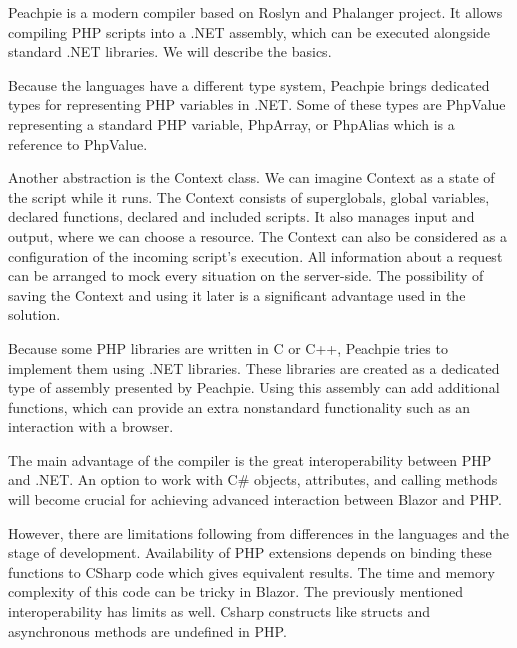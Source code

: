 Peachpie  is a modern compiler based on Roslyn and Phalanger project.
It allows compiling PHP scripts into a .NET assembly, which can be executed alongside standard .NET libraries.
We will describe the basics.
\par
Because the languages have a different type system, Peachpie brings dedicated types for representing PHP variables in .NET.
Some of these types are PhpValue representing a standard PHP variable, PhpArray, or PhpAlias which is a reference to PhpValue.
\par
Another abstraction is the Context class.
We can imagine Context as a state of the script while it runs.
The Context consists of superglobals, global variables, declared functions, declared and included scripts.
It also manages input and output, where we can choose a resource.
The Context can also be considered as a configuration of the incoming script's execution.
All information about a request can be arranged to mock every situation on the server-side.
The possibility of saving the Context and using it later is a significant advantage used in the solution.
\par
{}
Because some PHP libraries are written in C or C++, Peachpie tries to implement them using .NET libraries.
These libraries are created as a dedicated type of assembly presented by Peachpie.
Using this assembly can add additional functions, which can provide an extra nonstandard functionality such as an interaction with a browser.
\par
{}
The main advantage of the compiler is the great interoperability between PHP and .NET.
An option to work with C\# objects, attributes, and calling methods will become crucial for achieving advanced interaction between Blazor and PHP.
\par
However, there are limitations following from differences in the languages and the stage of development.
Availability of PHP extensions depends on binding these functions to CSharp code which gives equivalent results. 
The time and memory complexity of this code can be tricky in Blazor.
The previously mentioned interoperability has limits as well.
Csharp constructs like structs and asynchronous methods are undefined in PHP.
